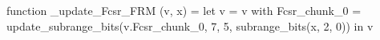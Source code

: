 function _update_Fcsr_FRM (v, x) = let v = { v with Fcsr_chunk_0 = update_subrange_bits(v.Fcsr_chunk_0, 7, 5, subrange_bits(x, 2, 0)) } in
  v
